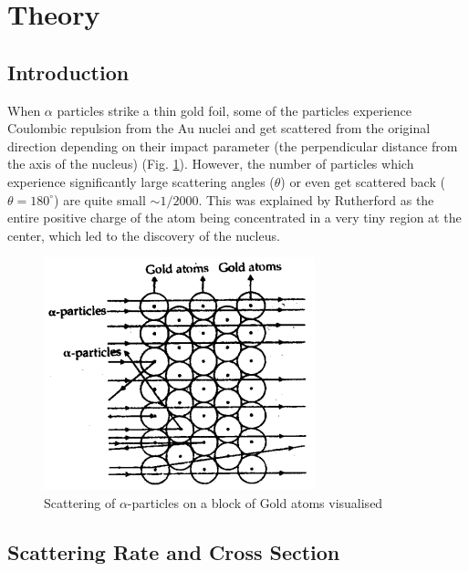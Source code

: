 \section{Theory}

\subsection{Introduction}
When $\alpha$ particles strike a thin gold foil, some of the particles experience Coulombic repulsion from the Au nuclei and get scattered from the original direction depending on their impact parameter (the perpendicular distance from the axis of the nucleus) (Fig. \ref{1}). However, the number of particles which experience significantly large scattering angles ($\theta$) or even get scattered back ($\theta=180^\circ$) are quite small $\sim 1/2000$. This was explained by Rutherford as the entire positive charge of the atom being concentrated in a very tiny region at the center, which led to the discovery of the nucleus.

\begin{figure}
    \centering
    \includegraphics[width=0.9\columnwidth]{images/scat.PNG}
    \caption{Scattering of $\alpha$-particles on a block of Gold atoms visualised}
    \label{1}
\end{figure}

\subsection{Scattering Rate and Cross Section}

